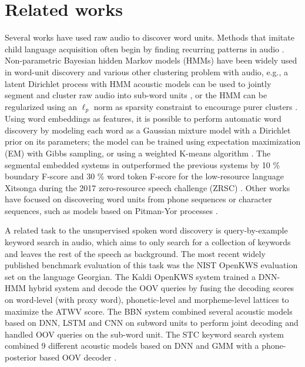 \documentclass[journal]{IEEEtran}
\begin{document}
\section{Related works}
Several works have used raw audio to discover word units. Methods that imitate child language acquisition often begin by finding recurring patterns in audio \cite{Rasanen2015, Park2008}. Non-parametric Bayesian hidden Markov models (HMMs) have been widely used in word-unit discovery and various other clustering problem with audio, e.g., a latent Dirichlet process with HMM acoustic models can be used to jointly segment and cluster raw audio into sub-word units \cite{Lee2012, Ondel2018}, or the HMM can be regularized using an \(\ell_p\) norm as sparsity constraint to encourage purer clusters \cite{Bharadwaj2013}. Using word embeddings as features, it is possible to perform automatic word discovery by modeling each word as a Gaussian mixture model with a Dirichlet prior on its parameters; the model can be trained using expectation maximization (EM) with Gibbs sampling, or using a weighted K-means algorithm \cite{Kamper2017}. The segmental embedded systems in \cite{Kamper2017} outperformed the previous systems by 10 \% boundary F-score and 30 \% word token F-score for the low-resource language Xitsonga during the 2017 zero-resource speech challenge (ZRSC) \cite{Dunbar2017}. Other works have focused on discovering word units from phone sequences or character sequences, such as models based on Pitman-Yor processes \cite{Johnson2007}. 

A related task to the unsupervised spoken word discovery is query-by-example keyword search in audio, which aims to only search for a collection of keywords and leaves the rest of the speech as background.
The most recent widely published benchmark evaluation of this task was the
NIST OpenKWS evaluation set on the language Georgian.
The Kaldi OpenKWS system \cite{Trmal2017} trained a DNN-HMM hybrid system and decode the OOV queries by fusing the decoding scores on word-level (with proxy word), phonetic-level and morpheme-level lattices to maximize the ATWV score.
The BBN system \cite{Alumae16} combined several acoustic models based on DNN, LSTM and CNN on subword units to perform joint decoding and handled OOV queries on the sub-word unit.
The STC keyword search system \cite{Medennikov2017} combined 9 different acoustic models based on DNN and GMM with a phone-posterior based OOV decoder \cite{Khokhlov2017}.  
\end{document}
